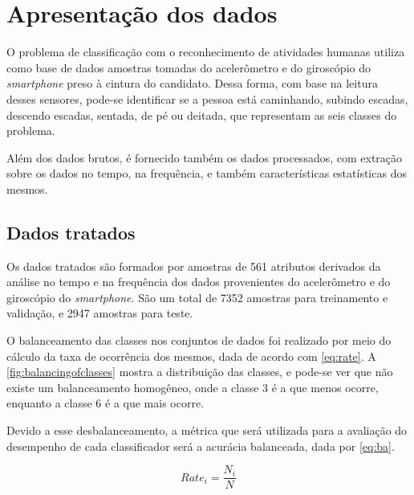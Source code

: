 
\section{Apresentação dos dados}

O problema de classificação com o reconhecimento de atividades humanas utiliza como base de dados amostras tomadas do acelerômetro e do giroscópio do \textit{smartphone} preso à cintura do candidato. Dessa forma, com base na leitura desses sensores, pode-se identificar se a pessoa está caminhando, subindo escadas, descendo escadas, sentada, de pé ou deitada, que representam as seis classes do problema.

Além dos dados brutos, é fornecido também os dados processados, com extração sobre os dados no tempo, na frequência, e também características estatísticas dos mesmos.

\subsection{Dados tratados}

Os dados tratados são formados por amostras de 561 atributos derivados da análise no tempo e na frequência dos dados provenientes do acelerômetro e do giroscópio do \textit{smartphone}. São um total de 7352 amostras para treinamento e validação, e 2947 amostras para teste.

O balanceamento das classes nos conjuntos de dados foi realizado por meio do cálculo da taxa de ocorrência dos mesmos, dada de acordo com \eqref{eq:rate}. A \autoref{fig:balancingofclasses} mostra a distribuição das classes, e pode-se ver que não existe um balanceamento homogêneo, onde a classe 3 é a que menos ocorre, enquanto a classe  6 é a que mais ocorre.

Devido a esse desbalanceamento, a métrica que será utilizada para a avaliação do desempenho de cada classificador será a acurácia balanceada, dada por \eqref{eq:ba}.

\begin{equation}\label{eq:rate}
	Rate_i = \frac{N_i}{N}
\end{equation}

